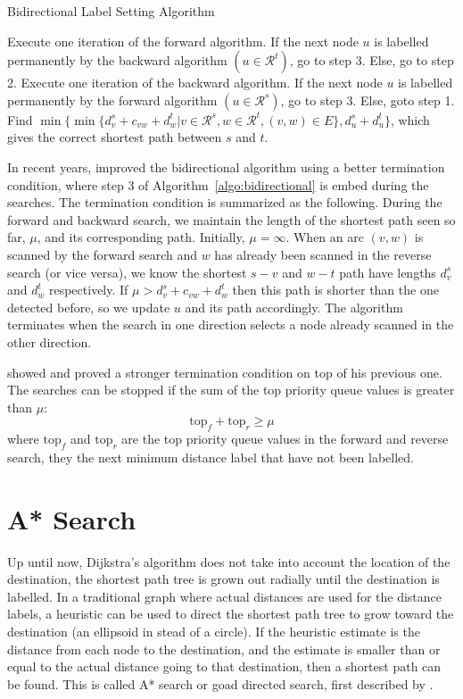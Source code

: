 \begin{algorithm}[H]
    \caption{Bidirectional Label Setting Algorithm }
    \label{algo:bidirectional}
    \begin{algorithmic}[1]
        \State Execute one iteration of the forward algorithm.
        If the next node $u$ is labelled permanently by the 
        backward algorithm $(u\in\mathcal{R}^t)$, go to step 3.
        Else, go to step 2.
        \State Execute one iteration of the backward algorithm.
        If the next node $u$ is labelled permanently by the
        forward algorithm $(u\in\mathcal{R}^s)$, go to step 3.
        Else, goto step 1.
        \State Find $\min\{\min\{d_v^s + c_{vw} + d_w^t | v \in \mathcal{R}^s, w \in \mathcal{R}^t, (v, w) \in E\}, d_u^s + d_u^t\}$, which gives the correct shortest path between $s$ and $t$.
    \EndProcedure
\end{algorithmic}
\end{algorithm}

In recent years,
\citet{Goldberg05} improved the bidirectional algorithm using a better termination condition,
where step 3 of Algorithm~\ref{algo:bidirectional} is embed during the searches.
The termination condition is summarized as the following.
During the forward and backward search,
we maintain the length of the shortest path seen so far, $\mu$, and its corresponding path. Initially, $\mu = \infty$.
When an arc $(v,w)$ is scanned by the forward search and $w$ has already been scanned in the reverse search (or vice versa),
we know the shortest $s-v$ and $w-t$ path have lengths $d_v^s$ and $d_w^t$ respectively.
If $\mu > d_v^s + c_{vw} + d_w^t$ then this path is shorter than the one detected before, 
so we update $u$ and its path accordingly.
The algorithm terminates when the search in one direction selects a node already scanned in the other direction.

\citet{GoldbergEPP} showed and proved a stronger termination condition on top of his previous one.
The searches can be stopped if the sum of the top priority queue values is greater than $\mu$:
\[
    \text{top}_f + \text{top}_r \geq \mu
\]
where $\text{top}_f$ and $\text{top}_r$ are the top priority queue values in the forward and reverse search, they the next minimum distance label that have not been labelled.

\section{A* Search}
Up until now,
Dijkstra's algorithm does not take into account the location of the destination,
the shortest path tree is grown out radially until the destination is labelled.
In a traditional graph where actual distances are used for the distance labels,
a heuristic can be used to direct the shortest path tree to grow toward the destination (an ellipsoid in stead of a circle).
If the heuristic estimate is the distance from each node to the destination,
and the estimate is smaller than or equal to the actual distance going to that destination,
then a shortest path can be found. This is called A* search or goad directed search, first described by \citet{Astar}.

